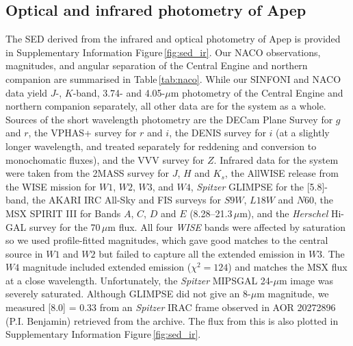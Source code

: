 \documentclass[preprint,times]{aastex61}
\begin{document}
\subsection{Optical and infrared photometry of Apep}
\label{sec:opt_ir_sed}

The SED derived from the infrared and optical photometry of Apep is provided in Supplementary Information Figure\,\ref{fig:sed_ir}. Our NACO observations, magnitudes, and angular separation of the Central Engine and northern companion are summarised in Table\,\ref{tab:naco}. While our SINFONI and NACO data yield $J$-, $K$-band, 3.74- and 4.05-$\mu$m photometry of the Central Engine and northern companion separately, all other data are for the system as a whole. Sources of the short wavelength photometry are the DECam Plane Survey \citep{DECamPS} for $g$ and $r$, the VPHAS+ survey \citep{VPHAS} for $r$ and $i$, the DENIS survey \citep{DENIS} for $i$ (at a slightly longer wavelength, and treated separately for reddening and conversion to monochomatic fluxes), and the VVV survey \citep{2010NewA...15..433M} for $Z$. Infrared data for the system were taken from the 2MASS \citep{Skrutskie2006} survey for $J$, $H$ and $K_s$, the AllWISE release from the WISE mission for $W1$, $W2$, $W3$, and $W4$, \emph{Spitzer} GLIMPSE for the [5.8]-band, the AKARI IRC All-Sky \citep{AKARI_IRC} and FIS \citep{AKARI_FIS} surveys for $S9W$, $L18W$ and $N60$, the MSX SPIRIT III \citep{MSX_GP} for Bands $A$, $C$, $D$ and $E$ (8.28--21.3\,$\mu$m), and the \emph{Herschel} Hi-GAL survey \citep{HiGAL} for the 70\,$\mu$m flux. All four {\em WISE} bands were affected by saturation so we used profile-fitted magnitudes, which gave good matches to the central source in $W1$ and $W2$ but failed to capture all the extended emission in $W3$. The $W4$ magnitude included extended emission ($\chi ^2 = 124$) and matches the MSX flux at a close wavelength. Unfortunately, the {\em Spitzer} MIPSGAL 24-$\mu$m image was severely saturated. Although GLIMPSE did not give an 8-$\mu$m magnitude, we measured [8.0] = 0.33 from an {\em Spitzer} IRAC frame observed in AOR 20272896 (P.I. Benjamin) retrieved from the archive. The flux from this is also plotted in Supplementary Information Figure\,\ref{fig:sed_ir}.
\end{document}
